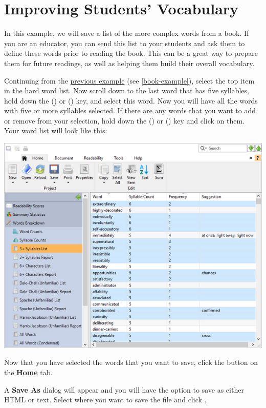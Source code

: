 \documentclass[
]{book}
\theoremstyle{definition}
\theoremstyle{definition}
\theoremstyle{definition}
\theoremstyle{definition}
\theoremstyle{remark}
\begin{document}
\hypertarget{vocab-builder-example}{%
\section{Improving Students' Vocabulary}\label{vocab-builder-example}}

In this example, we will save a list of the more complex words from a book. If you are an educator, you can send this list to your students and ask them to define these words prior to reading the book. This can be a great way to prepare them for future readings, as well as helping them build their overall vocabulary.

Continuing from the \protect\hyperlink{book-example}{previous example} (see \ref{book-example}), select the top item in the hard word list. Now scroll down to the last word that has five syllables, hold down the  (\faWindows) or \keys{\shift} (\faApple) key, and select this word. Now you will have all the words with five or more syllables selected. If there are any words that you want to add or remove from your selection, hold down the  (\faWindows) or \keys{\cmd} (\faApple) key and click on them. Your word list will look like this:

\includegraphics{Images/difficultwords2.png}

Now that you have selected the words that you want to save, click the  button on the \textbf{Home} tab.

A \textbf{Save As} dialog will appear and you will have the option to save as either HTML or text. Select where you want to save the file and click .
\end{document}
